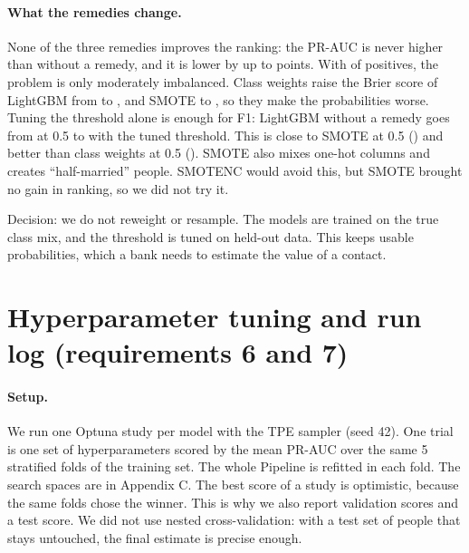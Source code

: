 \documentclass[11pt,a4paper]{article}
\newcommand{\tablefile}[1]{\begin{center}\small\resizebox{\linewidth}{!}{}\end{center}}
\begin{document}
\paragraph{What the remedies change.} None of the three remedies improves the ranking: the PR-AUC is never higher than without a remedy, and it is lower by up to \remedyLossMax{} points. With \posRate{} of positives, the problem is only moderately imbalanced. Class weights raise the Brier score of LightGBM from \brierLgbNone{} to \brierLgbBal, and SMOTE to \brierLgbSmote, so they make the probabilities worse. Tuning the threshold alone is enough for F1: LightGBM without a remedy goes from \fHalfLgbNone{} at 0.5 to \fTunedLgbNone{} with the tuned threshold. This is close to SMOTE at 0.5 (\fHalfLgbSmote) and better than class weights at 0.5 (\fHalfLgbBal). SMOTE also mixes one-hot columns and creates ``half-married'' people. SMOTENC would avoid this, but SMOTE brought no gain in ranking, so we did not try it.

Decision: we do not reweight or resample. The models are trained on the true class mix, and the threshold is tuned on held-out data. This keeps usable probabilities, which a bank needs to estimate the value of a contact.

\section{Hyperparameter tuning and run log (requirements 6 and 7)}
\paragraph{Setup.} We run one Optuna study per model with the TPE sampler (seed 42). One trial is one set of hyperparameters scored by the mean PR-AUC over the same 5 stratified folds of the training set. The whole Pipeline is refitted in each fold. The search spaces are in Appendix C. The best score of a study is optimistic, because the same folds chose the winner. This is why we also report validation scores and a test score. We did not use nested cross-validation: with a test set of \nTest{} people that stays untouched, the final estimate is precise enough.



\tablefile{table_tuned.tex}
\label{tab:tuned}
\end{document}
